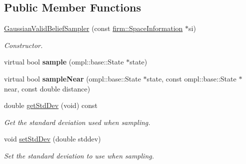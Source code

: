 \subsection*{\-Public \-Member \-Functions}
\begin{DoxyCompactItemize}
\item 
\hypertarget{class_gaussian_valid_belief_sampler_ae3c0e5503ddc85cc2943d3fda5ca1247}{\hyperlink{class_gaussian_valid_belief_sampler_ae3c0e5503ddc85cc2943d3fda5ca1247}{\-Gaussian\-Valid\-Belief\-Sampler} (const \hyperlink{classfirm_1_1_space_information}{firm\-::\-Space\-Information} $\ast$si)}\label{class_gaussian_valid_belief_sampler_ae3c0e5503ddc85cc2943d3fda5ca1247}

\begin{DoxyCompactList}\small\item\em \-Constructor. \end{DoxyCompactList}\item 
\hypertarget{class_gaussian_valid_belief_sampler_a70901adff599cc2219f7269568bad91d}{virtual bool {\bfseries sample} (ompl\-::base\-::\-State $\ast$state)}\label{class_gaussian_valid_belief_sampler_a70901adff599cc2219f7269568bad91d}

\item 
\hypertarget{class_gaussian_valid_belief_sampler_a0e08191a299ce7ddc48f2e316c9fdd65}{virtual bool {\bfseries sample\-Near} (ompl\-::base\-::\-State $\ast$state, const ompl\-::base\-::\-State $\ast$near, const double distance)}\label{class_gaussian_valid_belief_sampler_a0e08191a299ce7ddc48f2e316c9fdd65}

\item 
\hypertarget{class_gaussian_valid_belief_sampler_a3e6bb843f415b78742efcebbc9657ed0}{double \hyperlink{class_gaussian_valid_belief_sampler_a3e6bb843f415b78742efcebbc9657ed0}{get\-Std\-Dev} (void) const }\label{class_gaussian_valid_belief_sampler_a3e6bb843f415b78742efcebbc9657ed0}

\begin{DoxyCompactList}\small\item\em \-Get the standard deviation used when sampling. \end{DoxyCompactList}\item 
\hypertarget{class_gaussian_valid_belief_sampler_ab0beca356924545e0cb27292495995a5}{void \hyperlink{class_gaussian_valid_belief_sampler_ab0beca356924545e0cb27292495995a5}{set\-Std\-Dev} (double stddev)}\label{class_gaussian_valid_belief_sampler_ab0beca356924545e0cb27292495995a5}

\begin{DoxyCompactList}\small\item\em \-Set the standard deviation to use when sampling. \end{DoxyCompactList}\end{DoxyCompactItemize}
